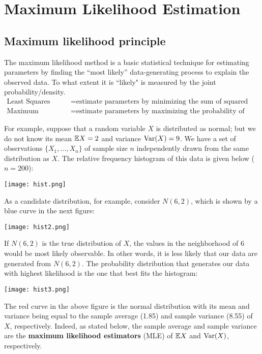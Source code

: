 \documentclass[11pt, A4paper, openany, uplatex]{book}
\begin{document}

\chapter{Maximum Likelihood Estimation}\label{chap:mle}
\section{Maximum likelihood principle}
The maximum likelihood method is a basic statistical technique for estimating parameters by finding the ``most likely'' data-generating process to explain the observed data.
To what extent it is ``likely" is measured by the joint probability/density. 
\begin{align*}
\text{Least Squares} &= \text{estimate parameters by minimizing the sum of squared errors}\\
\text{Maximum Likelihood} &= \text{estimate parameters by maximizing the probability of observing the data}
\end{align*}

For example, suppose that a random variable $X$ is distributed as normal; but we do not know its mean $\mathbb{E} X = 2$ and variance $\mathrm{Var}(X) = 9$.
We have a set of observations $\{X_1, \ldots ,X_n\}$ of sample size $n$ independently drawn from the same distribution as $X$.
The relative frequency histogram of this data is given below ($n = 200$):
\begin{center}
	\texttt{[image: hist.png]}
\end{center}
As a candidate distribution, for example, consider $N(6, 2)$, which is shown by a blue curve in the next figure:
\begin{center}
\texttt{[image: hist2.png]}
\end{center}
If $N(6, 2)$ is the true distribution of $X$, the values in the neighborhood of $6$ would be most likely observable.
In other words, it is less likely that our data are generated from $N(6, 2)$.
The probability distribution that generates our data with highest likelihood is the one that best fits the histogram:
\begin{center}
\texttt{[image: hist3.png]}
\end{center}
The red curve in the above figure is the normal distribution with its mean and variance being equal to the sample average (1.85) and sample variance (8.55) of $X$, respectively.
Indeed, as stated below, the sample average and sample variance are the \textbf{maximum likelihood estimators} (MLE) of $\mathbb{E} X$ and $\mathrm{Var}(X)$, respectively.
\end{document}
